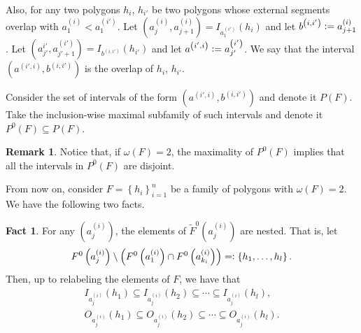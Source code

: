 \documentclass[12pt]{article}
\theoremstyle{definition}
\newtheorem{rmk}[thm]{Remark}
\newtheorem{fact}[thm]{Fact}
\newcommand{\defeq}{\vcentcolon=}
\newcommand{\eqdef}{=\vcentcolon}
\begin{document}
     Also, for any two polygons
     $h_{i}$, $h_{i'}$ be two
     polygons whose external segments
     overlap with
     $a_1^{\left(i\right)} < a_1^{\left(i'\right)}$.
     Let $\left(a_{j}^{\left(i\right)},
     a_{j+1}^{\left(i\right)}\right) =
     I_{a_1^{\left(i'\right)}}\left(h_{i}\right)$
     and let
     $b^{\left(i, i'\right)} \defeq a_{j+1}^{\left(i\right)}$.
     Let $\left(a_{j'}^{i'}, a_{j'+1}^{\left(i'\right)}\right)
     = I_{b^{\left(i,i'\right)}}\left(h_{i'}\right)$ 
     and let $a^{\left(i',i\right)}
     \defeq a_{j'}^{\left(i'\right)}$.
     We say that the interval
     $\left(a^{\left(i', i\right)},
     b^{\left(i, i'\right)}\right)$ 
     is the overlap of $h_{i}$, $h_{i'}$.

     Consider the set of intervals
     of the form $\left(a^{\left(i',i\right)},
     b^{\left(i,i'\right)}\right)$ 
     and denote it $P\left(F\right)$.
     Take the inclusion-wise maximal
     subfamily of such intervals
     and denote it $P^{0}\left(F\right)
     \subseteq P\left(F\right)$.
     
     \begin{rmk}
         Notice that, if 
         $\omega\left(F\right) = 2$,
         the maximality of
         $P^{0}\left(F\right)$ 
         implies that all the
         intervals in $P^{0}\left(F\right)$
         are disjoint.
     \end{rmk}

     From now on, consider
     $F = \left\{h_{i}\right\}_{i = 1}^{n}$ 
     be a family of polygons
     with $\omega\left(F\right)=2$.
     We have the following two facts.

     \begin{fact}
         For any $\left(a_{j}^{\left(i\right)}\right)$,
         the elements of
         $\widetilde{F}^{0}\left(a_{j}^{\left(i\right)}\right)$ 
         are nested. That is, let
         \begin{gather*}
             F^{0}\left(a_{j}^{\left(i\right)}\right) \setminus 
             \left(F^{0}\left(a_{1}^{\left(i\right)}\right) \cap 
             F^{0}\left(a_{k_{i}}^{\left(i\right)}\right)\right)
             \eqdef \left\{h_1, \ldots, h_{l}\right\}.
         \end{gather*}
         Then, up to relabeling
         the elements of $F$, we have that
         \begin{gather*}
             I_{a_{j}^{\left(i\right)}}\left(h_1\right)
             \subseteq I_{a_{j}^{\left(i\right)}}\left(h_2\right)
             \subseteq \cdots
             \subseteq I_{a_{j}^{\left(i\right)}}\left(h_{l}\right), \\
             O_{a_{j}^{\left(i\right)}}\left(h_1\right)
             \subseteq O_{a_{j}^{\left(i\right)}}\left(h_2\right)
             \subseteq \cdots
             \subseteq O_{a_{j}^{\left(i\right)}}\left(h_{l}\right).
         \end{gather*}
     \end{fact}
     
\end{document}
